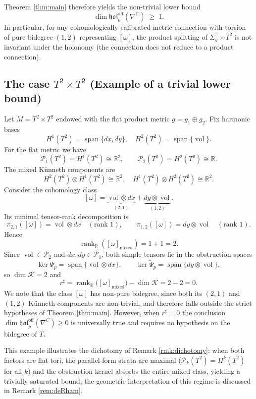 \documentclass[11pt,reqno]{amsart}
\theoremstyle{plain}
\theoremstyle{definition}
\numberwithin{equation}{section}
\begin{document}
Theorem \ref{thm:main} therefore yields the non-trivial lower bound
\[
\dim\mathfrak{hol}^{\mathrm{off}}_{p}(\nabla^{C})\;\geq\;1.
\]
In particular, for any cohomologically calibrated metric connection with torsion of pure bidegree $(1,2)$ representing $[\omega]$, the product splitting of $\Sigma_g\times T^{2}$ is not invariant under the holonomy (the connection does not reduce to a product connection).

\subsection*{The case $T^2 \times T^2$ 
(Example of a trivial lower bound)}

Let $M = T^2 \times T^2$ endowed with the flat product 
metric $g = g_1 \oplus g_2$.  Fix harmonic bases
\[
  H^1(T^2) = \operatorname{span}\{dx, dy\}, \quad 
  H^2(T^2) = \operatorname{span}\{\operatorname{vol}\}.
\]
For the flat metric we have
\[
  \mathcal{P}_1(T^2) = H^1(T^2) \cong \mathbb{R}^2, 
  \qquad
  \mathcal{P}_2(T^2) = H^2(T^2) \cong \mathbb{R}.
\]
The mixed K\"unneth components are
\[
  H^2(T^2) \otimes H^1(T^2) \cong \mathbb{R}^2, \quad 
  H^1(T^2) \otimes H^2(T^2) \cong \mathbb{R}^2.
\]
Consider the cohomology class
\[
  [\omega] = \underbrace{\operatorname{vol} \otimes dx}
  _{(2,1)} 
  + \underbrace{dy \otimes \operatorname{vol}}_{(1,2)}.
\]
Its minimal tensor-rank decomposition is
\[
  \pi_{2,1}([\omega]) = \operatorname{vol} \otimes dx 
  \quad (\text{rank } 1), \qquad
  \pi_{1,2}([\omega]) = dy \otimes \operatorname{vol} 
  \quad (\text{rank } 1).
\]
Hence
\[
  \operatorname{rank}_{\mathbb{R}}
  ([\omega]_{\text{mixed}}) = 1 + 1 = 2.
\]
Since $\operatorname{vol} \in \mathcal{P}_2$ and 
$dx, dy \in \mathcal{P}_1$, both simple tensors lie in 
the obstruction spaces
\[
  \ker\Psi_p = \operatorname{span}
  \{\operatorname{vol} \otimes dx\}, \qquad
  \ker\tilde{\Psi}_p = \operatorname{span}
  \{dy \otimes \operatorname{vol}\},
\]
so $\dim\mathcal{K} = 2$ and
\[
  r^{\sharp} = \operatorname{rank}_{\mathbb{R}}
  \bigl([\omega]_{\mathrm{mixed}}\bigr) 
  - \dim\mathcal{K} = 2-2 = 0.
\]
We note that the class $[\omega]$ has non-pure bidegree, 
since both its $(2,1)$ and $(1,2)$ K\"unneth components 
are non-trivial, and therefore falls outside the strict 
hypotheses of Theorem \ref{thm:main}.  However, when 
$r^{\sharp}=0$ the conclusion 
$\dim\mathfrak{hol}_{p}^{\mathrm{off}}(\nabla^{C})
\geq 0$ is universally true and requires no hypothesis 
on the bidegree of $T$.

This example illustrates the dichotomy of 
Remark \ref{rmk:dichotomy}: when both factors are flat 
tori, the parallel-form strata are maximal 
($\mathcal{P}_k(T^2) = H^k(T^2)$ for all $k$) and the 
obstruction kernel absorbs the entire mixed class, 
yielding a trivially saturated bound; the geometric interpretation of this regime is discussed in Remark \ref{rem:deRham}.
\end{document}
